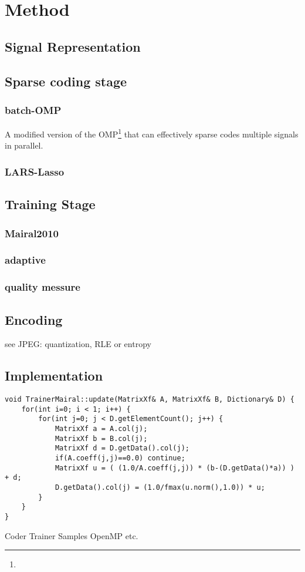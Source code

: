 \chapter{Method}


\section{Signal Representation}

\section{Sparse coding stage}
\subsection{batch-OMP}
A modified version of the OMP\footnote{} that can effectively sparse codes multiple signals in parallel.

\subsection{LARS-Lasso}

\section{Training Stage}
\subsection{Mairal2010}

\subsection{adaptive}

\subsection{quality messure}

\section{Encoding}
see JPEG: quantization, RLE or entropy


\section{Implementation}
\lstset{language=C++,caption=Test Code}
\begin{lstlisting}
void TrainerMairal::update(MatrixXf& A, MatrixXf& B, Dictionary& D) {
    for(int i=0; i < 1; i++) {
        for(int j=0; j < D.getElementCount(); j++) { 
            MatrixXf a = A.col(j);
            MatrixXf b = B.col(j);
            MatrixXf d = D.getData().col(j);
            if(A.coeff(j,j)==0.0) continue;
            MatrixXf u = ( (1.0/A.coeff(j,j)) * (b-(D.getData()*a)) ) + d;
            D.getData().col(j) = (1.0/fmax(u.norm(),1.0)) * u;
        }
    }
}
\end{lstlisting}
Coder
Trainer
Samples
OpenMP
etc.


